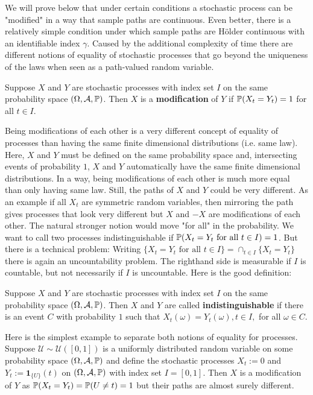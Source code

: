 We will prove below that under certain conditions a stochastic process can be "modified"{} in a way that sample paths are continuous. Even better, there is a relatively simple condition under which sample paths are H\"older continuous with an identifiable index $\gamma$. Caused by the additional complexity of time there are different notions of equality of stochastic processes that go beyond the uniqueness of the laws when seen as a path-valued random variable. 
\begin{ldef}
	\begin{deff}
		Suppose $X$ and $Y$ are stochastic processes with index set $I$ on the same probability space $(\Omega, \mathcal A, \P)$. Then $X$ is a \textbf{modification} of $Y$ if $\P(X_t=Y_t)=1$ for all $t\in I$. 
	\end{deff}
\end{ldef}
Being modifications of each other is a very different concept of equality of processes than having the same finite dimensional distributions (i.e. same law). Here, $X$ and $Y$ must be defined on the same probability space and, intersecting events of probability $1$, $X$ and $Y$ automatically have the same finite dimensional distributions. In a way, being modifications of each other is much more equal than only having same law. Still, the paths of $X$ and $Y$ could be very different. As an example if all $X_t$ are symmetric random variables, then mirroring the path gives processes that look very different but $X$ and $-X$ are modifications of each other. The natural stronger notion would move "for all"{} in the probability. We want to call two processes indistinguishable if $\P(X_t=Y_t\text{ for all }t\in I)=1$. But there is a technical problem: Writing $\{X_t=Y_t\text{ for all }t\in I\}=\cap_{t\in I}\{X_t=Y_t\}$ there is again an uncountability problem. The righthand side is measurable if $I$ is countable, but not necessarily if $I$ is uncountable. Here is the good definition:
\begin{ldef}
	\begin{deff}
		Suppose $X$ and $Y$ are stochastic processes with index set $I$ on the same probability space $(\Omega, \mathcal A, \P)$. Then $X$ and $Y$ are called \textbf{indistinguishable} if there is an event $C$ with probability $1$ such that $X_t(\omega)=Y_t(\omega), t\in I,$ for all $\omega\in C$.
	\end{deff}
\end{ldef}
Here is the simplest example to separate both notions of equality for processes. Suppose $\mathcal U\sim \mathcal U([0,1])$ is a uniformly distributed random variable on some probability space $(\Omega, \mathcal A, \P)$ and define the stochastic processes $X_t:=0$ and $Y_t:=\mathbf 1_{\{U\}}(t)$ on $(\Omega, \mathcal A, \P)$ with index set $I=[0,1]$. Then $X$ is a modification of $Y$ as $\P(X_t=Y_t)=\P(U\neq t)=1$ but their paths are almost surely different.
